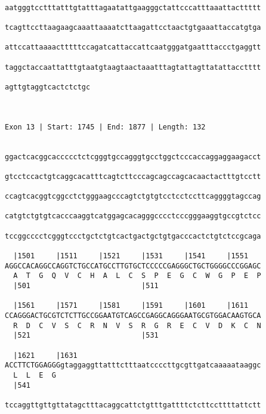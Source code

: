 \documentclass{article}
\begin{document}
\begin{Verbatim}
  
aatgggtcctttatttgtatttagaatattgaagggctattcccatttaaattacttttt
                                                            
tcagttccttaagaagcaaattaaaatcttaagattcctaactgtgaaattaccatgtga
                                                            
attccattaaaactttttccagatcattaccattcaatgggatgaatttaccctgaggtt
                                                            
taggctaccaattatttgtaatgtaagtaactaaatttagtattagttatattacctttt
                                                            
agttgtaggtcactctctgc
                    
                    
 
Exon 13 | Start: 1745 | End: 1877 | Length: 132


ggactcacggcaccccctctcgggtgccagggtgcctggctcccaccaggaggaagacct
                                                            
gtcctccactgtcaggcacatttcagtcttcccagcagccagcacaactactttgtcctt
                                                            
ccagtcacggtcggcctctgggaagcccagtctgtgtcctcctccttcaggggtagccag
                                                            
catgtctgtgtcacccaaggtcatggagcacagggcccctcccgggaaggtgccgtctcc
                                                            
tccggcccctcgggtccctgctctgtcactgactgctgtgacccactctgtctccgcaga
                                                            
  |1501     |1511     |1521     |1531     |1541     |1551   
AGGCCACAGGCCAGGTCTGCCATGCCTTGTGCTCCCCCGAGGGCTGCTGGGGCCCGGAGC
  A  T  G  Q  V  C  H  A  L  C  S  P  E  G  C  W  G  P  E  P
  |501                          |511                        
  
  |1561     |1571     |1581     |1591     |1601     |1611   
CCAGGGACTGCGTCTCTTGCCGGAATGTCAGCCGAGGCAGGGAATGCGTGGACAAGTGCA
  R  D  C  V  S  C  R  N  V  S  R  G  R  E  C  V  D  K  C  N
  |521                          |531                        
  
  |1621     |1631                                           
ACCTTCTGGAGGGgtaggaggttatttctttaatccccttgcgttgatcaaaaataaggc
  L  L  E  G                                                
  |541                                                      
  
tccaggttgttgttatagctttacaggcattctgtttgattttctcttccttttattctt
                                                            

\end{Verbatim}
\end{document}
